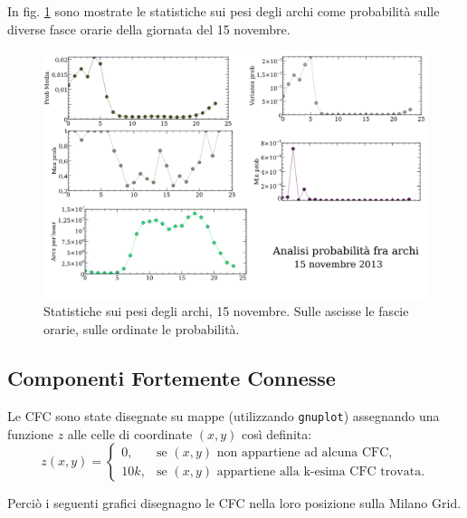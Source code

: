 \documentclass[10pt,a4paper]{article}
\begin{document}
In fig. \ref{img:probs} sono mostrate le statistiche sui pesi degli archi come probabilità sulle diverse
fasce orarie della giornata del 15 novembre.
\begin{figure}
 \includegraphics[scale=.6]{img/probs15nov.png}
 \caption{Statistiche sui pesi degli archi, 15 novembre. Sulle ascisse le fascie orarie, sulle ordinate le probabilità.}
 \label{img:probs}
\end{figure}

\subsection{Componenti Fortemente Connesse}

Le CFC sono state disegnate su mappe (utilizzando \verb!gnuplot!) assegnando una funzione $z$ alle celle di
coordinate $(x,y)$ così definita:
$$
z(x,y) =
\begin{cases}
0, & \text{se $(x,y)$ non appartiene ad alcuna CFC,} \\
10k, & \text{se $(x,y)$ appartiene alla k-esima CFC trovata.}
\end{cases}
$$

Perciò i seguenti grafici disegnagno le CFC nella loro posizione sulla Milano Grid.
\end{document}
